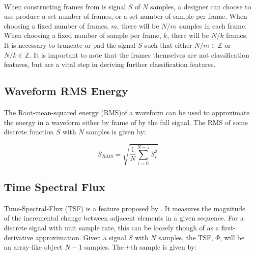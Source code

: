 \documentclass[12pt,letterpaper]{article}
\begin{document}
\paragraph*{}When constructing frames from is signal $S$ of $N$ samples, a designer can choose to use produce a set number of frames, or a set number of sample per frame. When choosing a fixed number of frames, $m$, there will be $N/m$ samples in each frame. When choosing a fixed number of sample per frame, $k$, there will be $N/k$ frames. It is necessary to truncate or pad the signal $S$ such that either $N/m \in \mathbb{Z}$ or $N/k \in \mathbb{Z}$. It is important to note that the frames themselves are not classification features, but are a vital step in deriving further classification features.


\subsection{Waveform RMS Energy}

\paragraph*{}The Root-mean-squared energy (RMS)of a waveform can be used to approximate the energy in a waveform either by frame of by the full signal. The RMS of some discrete function $S$ with $N$ samples is given by:

\begin{equation}
\label{RMS}
S_{RMS} = \sqrt{\frac{1}{N}\sum_{i=0}^{N-1}S_i^2}
\end{equation}





\subsection{Time Spectral Flux}

\paragraph*{}Time-Spectral-Flux (TSF) is a feature proposed by \cite{Kahn 2006}. It measures the magnitude of the incremental change between adjacent elements in a given sequence. For a discrete signal with unit sample rate, this can be loosely though of as a first-derivative approximation. Given a signal $S$ with $N$ samples, the TSF, $\Phi$, will be an array-like object $N-1$ samples. The $i$-th sample is given by:
\end{document}
